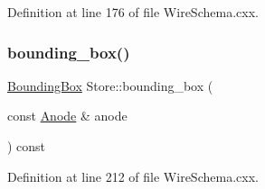 Definition at line 176 of file Wire\+Schema.\+cxx.

\mbox{\label{class_wire_cell_1_1_wire_schema_1_1_store_acfb80d41d1fe8264ea07c9d63a5202fe}} 
\subsubsection{\texorpdfstring{bounding\+\_\+box()}{bounding\_box()}\hspace{0.1cm}{\footnotesize\ttfamily [1/3]}}
{\footnotesize\ttfamily \hyperlink{class_wire_cell_1_1_bounding_box}{Bounding\+Box} Store\+::bounding\+\_\+box (\begin{DoxyParamCaption}\item[{const \hyperlink{struct_wire_cell_1_1_wire_schema_1_1_anode}{Anode} \&}]{anode }\end{DoxyParamCaption}) const}



Definition at line 212 of file Wire\+Schema.\+cxx.


